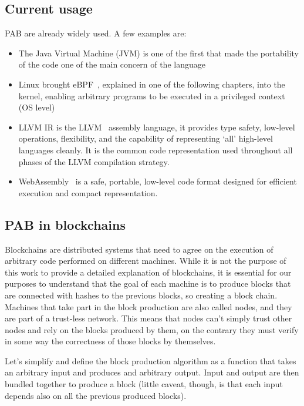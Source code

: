 \documentclass[../main.tex]{subfiles}
\begin{document}
\subsection{Current usage}

PAB are already widely used. A few examples are:

\begin{itemize}
  \item
        The Java Virtual Machine (JVM) is one of the first that made the portability of the code one of the main concern of the language
  \item
        Linux brought eBPF~\cite{ebpf}, explained in one of the following chapters, into the kernel, enabling arbitrary programs to be executed in a privileged context (OS level)
  \item
        LLVM IR is the LLVM~\cite{LLVM} assembly language, it provides type safety, low-level operations, flexibility, and the capability of representing ‘all’ high-level languages cleanly. It is the common code representation used throughout all phases of the LLVM compilation strategy.
  \item
        WebAssembly~\cite{wasm-core-spec} is a safe, portable, low-level code format designed for efficient execution and compact representation.
\end{itemize}

\subsection{PAB in blockchains}

Blockchains are distributed systems that need to agree on the execution of arbitrary code performed on different machines. While it is not the purpose of this work to provide a detailed explanation of blockchains, it is essential for our purposes to understand that the goal of each machine is to produce blocks that are connected with hashes to the previous blocks, so creating a block chain. Machines that take part in the block production are also called nodes, and they are part of a trust-less network. This means that nodes can't simply trust other nodes and rely on the blocks produced by them, on the contrary they must verify in some way the correctness of those blocks by themselves.

Let's simplify and define the block production algorithm as a function that takes an arbitrary input and produces and arbitrary output. Input and output are then bundled together to produce a block (little caveat, though, is that each input depends also on all the previous produced blocks).
\end{document}
